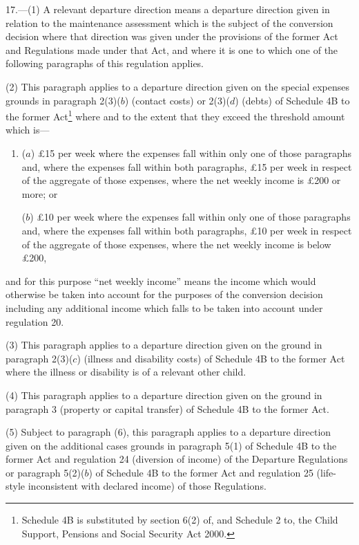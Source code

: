 \documentclass[12pt,a4paper]{article}
\begin{document}
17.---(1)  A relevant departure direction means a departure direction given in relation to the maintenance assessment which is the subject of the conversion decision where that direction was given under the provisions of the former Act and Regulations made under that Act, and where it is one to which one of the following paragraphs of this regulation applies.

(2) This paragraph applies to a departure direction given on the special expenses grounds in paragraph 2(3)($b$)  (contact costs) or 2(3)($d$)  (debts) of Schedule 4B to the former Act\footnote{\frenchspacing Schedule 4B is substituted by section 6(2) of, and Schedule 2 to, the Child Support, Pensions and Social Security Act 2000.} where and to the extent that they exceed the threshold amount which is—
\begin{enumerate}\item[]
($a$) £15 per week where the expenses fall within only one of those paragraphs and, where the expenses fall within both paragraphs, £15 per week in respect of the aggregate of those expenses, where the net weekly income is £200 or more; or

($b$) £10 per week where the expenses fall within only one of those paragraphs and, where the expenses fall within both paragraphs, £10 per week in respect of the aggregate of those expenses, where the net weekly income is below £200,
\end{enumerate}
and for this purpose “net weekly income” means the income which would otherwise be taken into account for the purposes of the conversion decision including any additional income which falls to be taken into account under regulation 20.

(3) This paragraph applies to a departure direction given on the ground in paragraph 2(3)($c$)  (illness and disability costs) of Schedule 4B to the former Act where the illness or disability is of a relevant other child.

(4) This paragraph applies to a departure direction given on the ground in paragraph 3 (property or capital transfer) of Schedule 4B to the former Act.

(5) Subject to paragraph (6), this paragraph applies to a departure direction given on the additional cases grounds in paragraph 5(1) of Schedule 4B to the former Act and regulation 24 (diversion of income) of the Departure Regulations or paragraph 5(2)($b$)  of Schedule 4B to the former Act and regulation 25 (life-style inconsistent with declared income) of those Regulations.
\end{document}
